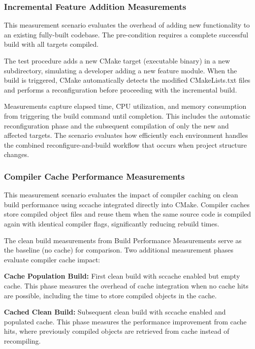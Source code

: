 \subsubsection{Incremental Feature Addition Measurements}

This measurement scenario evaluates the overhead of adding new functionality to an existing fully-built codebase.
The pre-condition requires a complete successful build with all targets compiled.

The test procedure adds a new CMake target (executable binary) in a new subdirectory, simulating a developer adding a new feature module.
When the build is triggered, CMake automatically detects the modified CMakeLists.txt files and performs a reconfiguration before proceeding with the incremental build.

Measurements capture elapsed time, CPU utilization, and memory consumption from triggering the build command until completion.
This includes the automatic reconfiguration phase and the subsequent compilation of only the new and affected targets.
The scenario evaluates how efficiently each environment handles the combined reconfigure-and-build workflow that occurs when project structure changes.

\subsubsection{Compiler Cache Performance Measurements}

This measurement scenario evaluates the impact of compiler caching on clean build performance using sccache integrated directly into CMake.
Compiler caches store compiled object files and reuse them when the same source code is compiled again with identical compiler flags, significantly reducing rebuild times.

The clean build measurements from Build Performance Measurements serve as the baseline (no cache) for comparison.
Two additional measurement phases evaluate compiler cache impact:

\textbf{Cache Population Build:}
First clean build with sccache enabled but empty cache.
This phase measures the overhead of cache integration when no cache hits are possible, including the time to store compiled objects in the cache.

\textbf{Cached Clean Build:}
Subsequent clean build with sccache enabled and populated cache.
This phase measures the performance improvement from cache hits, where previously compiled objects are retrieved from cache instead of recompiling.


